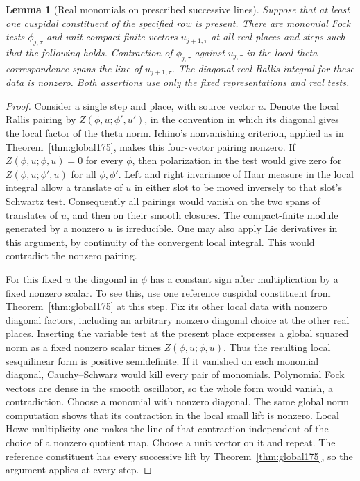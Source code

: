 \documentclass[a4paper,11pt]{article}
\newtheorem{lemma}[proposition]{Lemma}
\theoremstyle{definition}
\theoremstyle{remark}
\numberwithin{equation}{section}
\begin{document}
\begin{lemma}[Real monomials on prescribed successive lines]
\label{lem:monomials177}
Suppose that at least one cuspidal constituent of the
specified row is present. There are monomial Fock tests
\(\phi_{j,\tau}\) and unit compact-finite vectors
\(u_{j+1,\tau}\) at all real places and steps such that
the following holds. Contraction of \(\phi_{j,\tau}\)
against \(u_{j,\tau}\) in the local theta correspondence
spans the line of \(u_{j+1,\tau}\). The diagonal real Rallis
integral for these data is nonzero. Both assertions use
only the fixed representations and real tests.
\end{lemma}
\begin{proof}
Consider a single step and place, with source vector \(u\).
Denote the local Rallis pairing by
\(Z(\phi,u;\phi',u')\), in the convention in which its
diagonal gives the local factor of the theta norm.
Ichino's nonvanishing criterion, applied as in
Theorem~\ref{thm:global175}, makes this four-vector pairing
nonzero. If \(Z(\phi,u;\phi,u)=0\) for every \(\phi\), then
polarization in the test would give zero for
\(Z(\phi,u;\phi',u)\) for all \(\phi,\phi'\).
Left and right invariance of Haar measure in the local
integral allow a translate of \(u\) in either slot to be
moved inversely to that slot's Schwartz test. Consequently
all pairings would vanish on the two spans of translates of
\(u\), and then on their smooth closures. The compact-finite
module generated by a nonzero \(u\) is irreducible. One
may also apply Lie derivatives in this argument, by
continuity of the convergent local integral. This would
contradict the nonzero pairing.

For this fixed \(u\) the diagonal in \(\phi\) has a constant
sign after multiplication by a fixed nonzero scalar. To see
this, use one reference cuspidal constituent from
Theorem~\ref{thm:global175} at this step. Fix its other local
data with nonzero diagonal factors, including an arbitrary
nonzero diagonal choice at the other real places. Inserting
the variable test at the present place expresses a global
squared norm as a fixed nonzero scalar times
\(Z(\phi,u;\phi,u)\). Thus the resulting local sesquilinear
form is positive semidefinite. If it vanished on each
monomial diagonal, Cauchy--Schwarz would kill every pair
of monomials. Polynomial Fock vectors are dense in the
smooth oscillator, so the whole form would vanish, a
contradiction. Choose a monomial with nonzero diagonal.
The same global norm computation shows that its contraction
in the local small lift is nonzero. Local Howe multiplicity
one makes the line of that contraction independent of the
choice of a nonzero quotient map. Choose a unit vector on it
and repeat. The reference constituent has every successive
lift by Theorem~\ref{thm:global175}, so the argument applies
at every step.
\end{proof}
\end{document}
